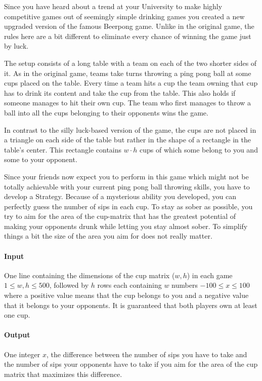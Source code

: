 



\makeheader

Since you have heard about a trend at your University to make highly competitive games out of seemingly simple drinking games you created a new upgraded version of the famous Beerpong game. Unlike in the original game, the rules here are a bit different to eliminate every chance of winning the game just by luck. 

The setup consists of a long table with a team on each of the two shorter sides of it. As in the original game, teams take turns throwing a ping pong ball at some cups placed on the table. Every time a team hits a cup the team owning that cup has to drink its content and take the cup from the table. This also holds if someone manages to hit their own cup. The team who first manages to throw a ball into all the cups belonging to their opponents wins the game. 

In contrast to the silly luck-based version of the game, the cups are not placed in a triangle on each side of the table but rather in the shape of a rectangle in the table's center. This rectangle contains $w \cdot h$ cups of which some belong to you and some to your opponent. 

Since your friends now expect you to perform in this game which might not be totally achievable with your current ping pong ball throwing skills, you have to develop a Strategy. Because of a mysterious ability you developed, you can perfectly guess the number of sips in each cup. To stay as sober as possible, you try to aim for the area of the cup-matrix that has the greatest potential of making your opponents drunk while letting you stay almost sober. To simplify things a bit the size of the area you aim for does not really matter.


\paragraph*{Input}
One line containing the dimensions of the cup matrix ($w,h$) in each game $1 \leq w,h \leq 500$, followed by $h$ rows each containing $w$ numbers $-100 \leq x \leq 100$ where a positive value means that the cup belongs to you and a negative value that it belongs to your opponents.
It is guaranteed that both players own at least one cup.

\paragraph*{Output}
One integer $x$, the difference between the number of sips you have to take and the number of sips your opponents have to take if you aim for the area of the cup matrix that maximizes this difference.

\begin{samples}
\end{samples}


